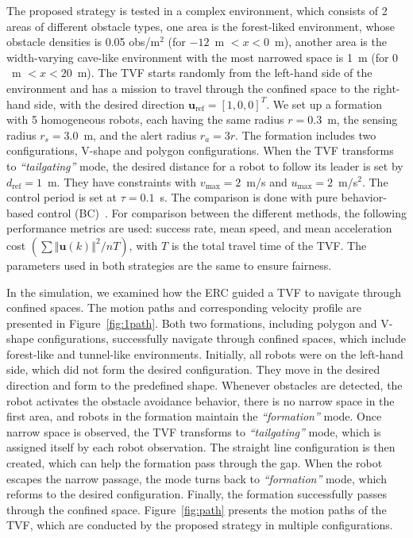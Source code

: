 The proposed strategy is tested in a complex environment, which consists of 2 areas of different obstacle types, one area is the forest-liked environment, whose obstacle densities is 0.05 obs/m$^2$ (for $-12$~m $<x<0$~m), another area is the width-varying cave-like environment with the most narrowed space is 1~m (for $0$~m $<x<20$~m). The TVF starts randomly from the left-hand side of the environment and has a mission to travel through the confined space to the right-hand side, with the desired direction $\mathbf{u}_\text{ref}=\left[1,0,0\right]^T$. We set up a formation with 5 homogeneous robots, each having the same radius $r=0.3$~m, the sensing radius $r_s=3.0$~m, and the alert radius $r_a=3r$. The formation includes two configurations, V-shape and polygon configurations. When the TVF transforms to \textit{``tailgating''} mode, the desired distance for a robot to follow its leader is set by $d_\text{ref}=1$~m. They have constraints with $v_\text{max}=2$~m/s and $u_\text{max}=2$~m/s$^2$. The control period is set at $\tau=0.1$~s. The comparison is done with pure behavior-based control (BC)~\cite{736776,Vsrhelyi2018}. For comparison between the different methods, the following performance metrics are used: success rate, mean speed, and mean acceleration cost $(\sum{\left\Vert \mathbf{u}(k)\right\Vert^2}/{nT})$, with $T$ is the total travel time of the TVF. The parameters used in both strategies are the same to ensure fairness.

In the simulation, we examined how the ERC guided a TVF to navigate through confined spaces. The motion paths and corresponding velocity profile are presented in Figure~\ref{fig:1path}. Both two formations, including polygon and V-shape configurations, successfully navigate through confined spaces, which include forest-like and tunnel-like environments. Initially, all robots were on the left-hand side, which did not form the desired configuration. They move in the desired direction and form to the predefined shape. Whenever obstacles are detected, the robot activates the obstacle avoidance behavior, there is no narrow space in the first area, and robots in the formation maintain the \textit{``formation''} mode. Once narrow space is observed, the TVF transforms to \textit{``tailgating''} mode, which is assigned itself by each robot observation. The straight line configuration is then created, which can help the formation pass through the gap. When the robot escapes the narrow passage, the mode turns back to \textit{``formation''} mode, which reforms to the desired configuration. Finally, the formation successfully passes through the confined space. Figure~\ref{fig:path} presents the motion paths of the TVF, which are conducted by the proposed strategy in multiple configurations.


